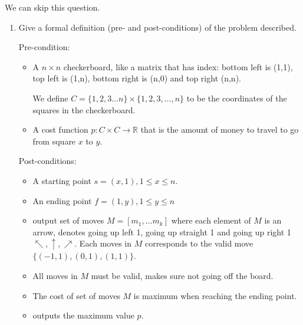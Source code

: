 \documentclass{cpsc413Solutions}
\begin{document}


\begin{problemlist}
\pbitem 
\begin{problem}
\begin{answer}

We can skip this question.

\end{answer}

\newpage

\pbitem
\begin{problem}
\begin{answer}

\begin{enumerate}
    \item Give a formal definition (pre- and post-conditions) of the problem described.
    
    Pre-condition:
    \begin{itemize}
        \item A $n \times n $ checkerboard, like a matrix that has index: bottom left is (1,1), top left is (1,n), bottom right is (n,0) and top right (n,n).
        
        We define $C = \{1,2,3 \dots n\} \times \{1,2,3, \dots, n\}$ to be the coordinates of the squares in the checkerboard.
        
        \item A cost function $p: C \times C \xrightarrow{} \mathds{R}$ that is the amount of money to travel to go from square $x$ to $y$.
    \end{itemize}
    Post-conditions:
    \begin{itemize}
        \item A starting point $s=(x,1), 1\leq x \leq n$.
        \item An ending point $f=(1,y), 1 \leq y \leq n$
        \item output set of moves $M = [m_1, \dots m_k]$ where each element of $M$ is an arrow, denotes going up left 1, going up straight 1 and going up right 1 $\nwarrow, \uparrow, \nearrow $. Each moves in $M$ corresponds to the valid move $\{ (-1,1),(0,1),(1,1)\}$.
        \item All moves in $M$ must be valid, makes sure not going off the board.
        \item The cost of set of moves $M$ is maximum when reaching the ending point.
        \item outputs the maximum value $p$.


\end{itemize}
\end{enumerate}
\end{answer}
\end{problem}
\end{problem}
\end{problemlist}
\end{document}
